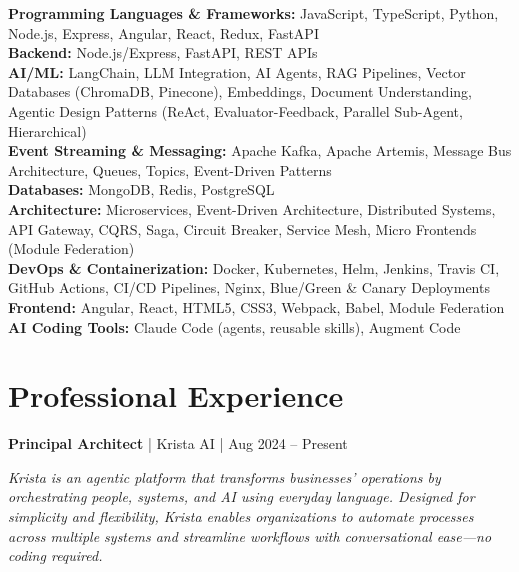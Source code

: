 \documentclass[a4paper,11pt]{article}
\newcommand{\jobtitle}[4]{
  \vspace{6pt}
  {\textbf{\textcolor{accent}{#1}} | #2 | #3}
  \vspace{2pt}
}
\begin{document}
\textbf{Programming Languages \& Frameworks:} JavaScript, TypeScript, Python, Node.js, Express, Angular, React, Redux, FastAPI \\[2pt]
\textbf{Backend:} Node.js/Express, FastAPI, REST APIs \\[2pt]
\textbf{AI/ML:} LangChain, LLM Integration, AI Agents, RAG Pipelines, Vector Databases (ChromaDB, Pinecone), Embeddings, Document Understanding, Agentic Design Patterns (ReAct, Evaluator-Feedback, Parallel Sub-Agent, Hierarchical) \\[2pt]
\textbf{Event Streaming \& Messaging:} Apache Kafka, Apache Artemis, Message Bus Architecture, Queues, Topics, Event-Driven Patterns \\[2pt]
\textbf{Databases:} MongoDB, Redis, PostgreSQL \\[2pt]
\textbf{Architecture:} Microservices, Event-Driven Architecture, Distributed Systems, API Gateway, CQRS, Saga, Circuit Breaker, Service Mesh, Micro Frontends (Module Federation) \\[2pt]
\textbf{DevOps \& Containerization:} Docker, Kubernetes, Helm, Jenkins, Travis CI, GitHub Actions, CI/CD Pipelines, Nginx, Blue/Green \& Canary Deployments \\[2pt]
\textbf{Frontend:} Angular, React, HTML5, CSS3, Webpack, Babel, Module Federation \\[2pt]
\textbf{AI Coding Tools:} Claude Code (agents, reusable skills), Augment Code

\section{Professional Experience}

\jobtitle{Principal Architect}{Krista AI}{Aug 2024 -- Present}{}

\textit{Krista is an agentic platform that transforms businesses' operations by orchestrating people, systems, and AI using everyday language. Designed for simplicity and flexibility, Krista enables organizations to automate processes across multiple systems and streamline workflows with conversational ease---no coding required.}
\end{document}
